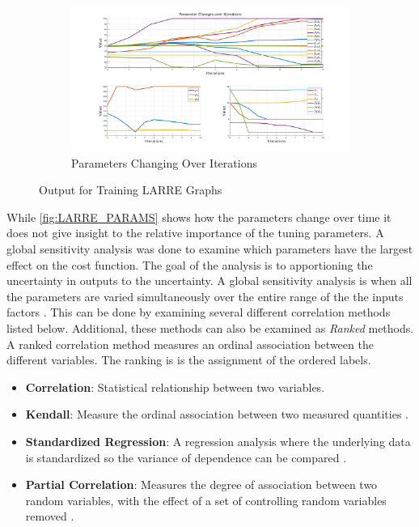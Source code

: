 \begin{figure}
    \begin{subfigure}[b]{\textwidth}
        \centering
        \includegraphics[width=0.8\columnwidth]{images/controllers/trajs/params_splite.png}
        \caption[LARRE Parameters Optimization]{Parameters Changing Over Iterations}
        \label{fig:LARRE_PARAMS}
    \end{subfigure}

    \caption{Output for Training LARRE Graphs}
    \label{fig:traj_training_graph}
\end{figure}


While \autoref{fig:LARRE_PARAMS} shows how the parameters change over time it does not give insight to the relative importance of the tuning parameters. A global sensitivity analysis was done to examine which parameters have the largest effect on the cost function. The goal of the analysis is to apportioning the uncertainty in outputs to the uncertainty. A global sensitivity analysis is when all the parameters are varied simultaneously over the entire range of the the inputs factors \cite{saltelli2008global}. This can be done by examining several different correlation methods listed below. Additional, these methods can also be examined as \textit{Ranked} methods. A ranked correlation method measures an ordinal association between the different variables. The ranking is is the assignment of the ordered labels. 

\begin{itemize}
    \item \textbf{Correlation}: Statistical relationship between two variables. 
    \item \textbf{Kendall}: Measure the ordinal association between two measured quantities \cite{abdi2007kendall}.
    \item \textbf{Standardized Regression}: A regression analysis where the underlying data is standardized so the variance of dependence can be compared \cite{SIEGEL2016355}.  
    \item \textbf{Partial Correlation}: Measures the degree of association between two random variables, with the effect of a set of controlling random variables removed \cite{PARTIALCORRELATION}. 
\end{itemize}




